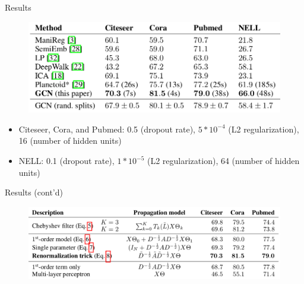 \documentclass{beamer}
\begin{document}
\begin{frame}{Results}
  \begin{figure}[H]
    \centering
    \includegraphics[width=1\textwidth, height=0.5\textheight, keepaspectratio]{img/comparison}
    \label{fig:comparison}
  \end{figure}
  \begin{itemize}
  \item Citeseer, Cora, and Pubmed: 0.5 (dropout rate), $5*10^{-4}$ (L2 regularization), 16 (number of hidden units)
    \item NELL: 0.1 (dropout rate), $1*10^{-5}$ (L2 regularization), 64 (number of hidden units)
  \end{itemize}
\end{frame}
\begin{frame}{Results (cont'd)}
  \begin{figure}[H]
    \centering
    \includegraphics[width=1\textwidth, height=0.5\textheight, keepaspectratio]{img/propagation}
    \label{fig:propagation}
  \end{figure}
\end{frame}
\end{document}
